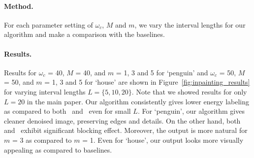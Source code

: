 \documentclass[10pt,letterpaper]{article}
\newcommand{\myparagraph}[1]{\vspace{0mm}\paragraph{#1}}
\begin{document}
\myparagraph{\bf Method.} For each parameter setting of $\omega_c$, $M$ and $m$, we vary the interval lengths for our algorithm and make a comparison with the baselines.

\myparagraph{\bf Results.} Results for $\omega_c$ = 40, $M$ = 40, and $m$ = 1, 3 and 5 for `penguin' and $\omega_c$ = 50, $M$ = 50, and $m$ = 1, 3 and 5 for `house' are shown in Figure~\ref{fig:inpainting_results} for varying interval lengths $L = \{5, 10, 20\}$. Note that we showed results for only $L = 20$ in the main paper. Our algorithm consistently gives lower energy labeling as compared to both~\cite{dokaniaiccv15} and~\cite{ladickyeccv10} even for small $L$. For `penguin', our algorithm gives cleaner denoised image, preserving edges and details. On the other hand, both~\cite{dokaniaiccv15} and~\cite{ladickyeccv10} exhibit significant blocking effect. Moreover, the output is more natural for $m$ = 3 as compared to $m$ = 1. Even for `house', our output looks more visually appealing as compared to baselines.
\end{document}
